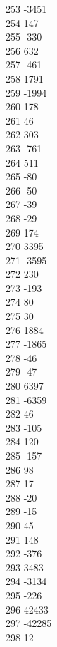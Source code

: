 { 253	-3451 \\
 254	147 \\
 255	-330 \\
 256	632 \\
 257	-461 \\
 258	1791 \\
 259	-1994 \\
 260	178 \\
 261	46 \\
 262	303 \\
 263	-761 \\
 264	511 \\
 265	-80 \\
 266	-50 \\
 267	-39 \\
 268	-29 \\
 269	174 \\
 270	3395 \\
 271	-3595 \\
 272	230 \\
 273	-193 \\
 274	80 \\
 275	30 \\
 276	1884 \\
 277	-1865 \\
 278	-46 \\
 279	-47 \\
 280	6397 \\
 281	-6359 \\
 282	46 \\
 283	-105 \\
 284	120 \\
 285	-157 \\
 286	98 \\
 287	17 \\
 288	-20 \\
 289	-15 \\
 290	45 \\
 291	148 \\
 292	-376 \\
 293	3483 \\
 294	-3134 \\
 295	-226 \\
 296	42433 \\
 297	-42285 \\
 298	12 \\
}
